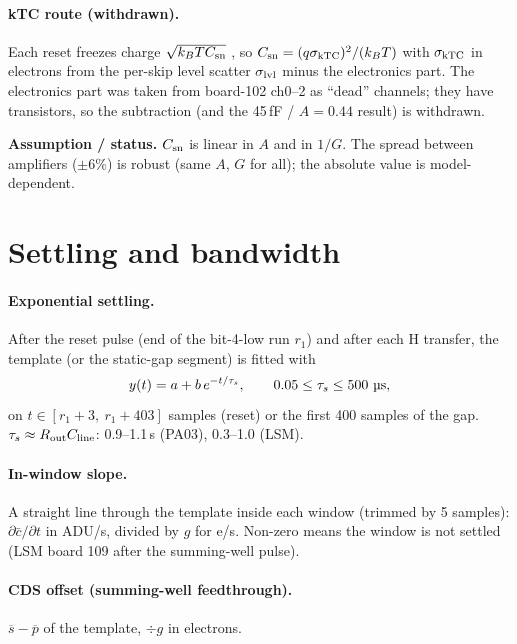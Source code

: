 \documentclass[10pt,a4paper]{article}
\newcommand{\caveat}[1]{\par\smallskip\noindent\colorbox{orange!10}{\parbox{\dimexpr\linewidth-2\fboxsep}{\small\textbf{Assumption / status.} #1}}\par\smallskip}
\begin{document}
\paragraph{kTC route (withdrawn).} Each reset freezes charge $\sqrt{k_BTC_{\rm sn}}$ \cite{janesick2001}, so
$C_{\rm sn}=(q\sigma_{\rm kTC})^2/(k_BT)$ with $\sigma_{\rm kTC}$ in electrons from the per-skip level scatter
$\sigma_{\rm lvl}$ minus the electronics part. The electronics part was taken from board-102 ch0--2 as ``dead''
channels; they have transistors, so the subtraction (and the 45\,fF / $A=0.44$ result) is withdrawn.

\caveat{$C_{\rm sn}$ is linear in $A$ and in $1/G$. The spread between amplifiers ($\pm6\%$) is robust (same $A$, $G$
for all); the absolute value is model-dependent.}

\section{Settling and bandwidth}

\paragraph{Exponential settling.} After the reset pulse (end of the bit-4-low run $r_1$) and after each H transfer,
the template (or the static-gap segment) is fitted with
\begin{equation}
y(t)=a+b\,e^{-t/\tau_s},\qquad 0.05\le\tau_s\le500\ \text{\textmu s},
\end{equation}
on $t\in[r_1+3,\ r_1+403]$ samples (reset) or the first 400 samples of the gap. $\tau_s\approx R_{\rm out}C_{\rm line}$:
0.9--1.1\,\textmu s (PA03), 0.3--1.0 (LSM).

\paragraph{In-window slope.} A straight line through the template inside each window (trimmed by 5 samples):
$\partial\bar c/\partial t$ in ADU/\textmu s, divided by $g$ for e/\textmu s. Non-zero means the window is not settled
(LSM board 109 after the summing-well pulse).

\paragraph{CDS offset (summing-well feedthrough).} $\overline{s}-\overline{p}$ of the template, $\div g$ in electrons.
\end{document}
